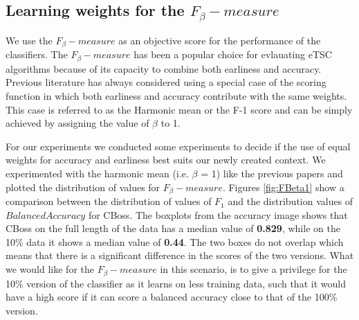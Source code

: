 \subsection{Learning weights for the $F_{\beta}-measure$}
\label{SubsectionLearningFBetaMeasure}
We use the $F_{\beta}-measure$ as an objective score for the performance of the classifiers.
The $F_{\beta}-measure$ has been a popular choice for evlauating eTSC algorithms \cite{schafer2020teaser} because of its
capacity to combine both earliness and accuracy.
Previous literature has always considered using a special case of the scoring function in which both earliness and accuracy contribute with the same weights.
This case is referred to as the Harmonic mean or the F-1 score and can be simply achieved by assigning the value of $\beta$ to 1.

For our experiments we conducted some experiments to decide if the use of equal weights for accuracy and earliness best suits our newly created context.
We experimented with the harmonic mean (i.e. $\beta$ = 1) like the previous papers and plotted the distribution of values for $F_{\beta}-measure$.
Figures \ref{fig:FBeta1} show a comparison between the distribution of values of $F_{1}$ and the distribution values of $Balanced Accuracy$ for CBoss.
The boxplots from the accuracy image shows that CBoss on the full length of the data has a median value of \textbf{0.829}, while on the 10\% data it shows a median value of \textbf{0.44}.
The two boxes do not overlap which means that there is a significant difference in the scores of the two versions.
What we would like for the $F_{\beta}-measure$ in this scenario, is to give a privilege for the 10\% version of the classifier as it learns on less training data, such that it would have
a high score if it can score a balanced accuracy close to that of the 100\% version.


